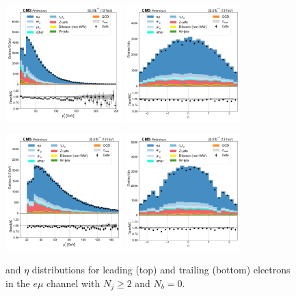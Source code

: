 \begin{figure}[htb!]
    \centering
    \includegraphics[width=0.4\textwidth]{chapters/Appendix/sectionPlots/figures/data_mc_overlays/emu_2016_cat_gt2_eq0_signal_linear_lepton_lepton1_pt}
    \includegraphics[width=0.4\textwidth]{chapters/Appendix/sectionPlots/figures/data_mc_overlays/emu_2016_cat_gt2_eq0_signal_linear_lepton_lepton1_eta}

    \includegraphics[width=0.4\textwidth]{chapters/Appendix/sectionPlots/figures/data_mc_overlays/emu_2016_cat_gt2_eq0_signal_linear_lepton_lepton2_pt}
    \includegraphics[width=0.4\textwidth]{chapters/Appendix/sectionPlots/figures/data_mc_overlays/emu_2016_cat_gt2_eq0_signal_linear_lepton_lepton2_eta}
    \caption{\pt and $\eta$ distributions for leading (top) and trailing
        (bottom) electrons in the $e\mu$ channel with $N_{j} \geq 2$ and
        $N_{b} = 0$.}
    \label{fig:emu_4_kinematic}
\end{figure}


